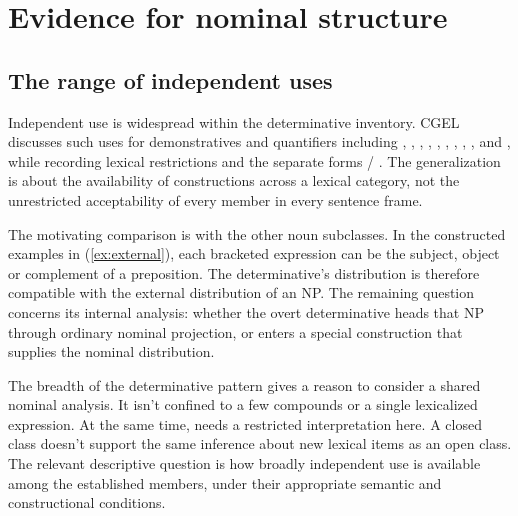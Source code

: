 \documentclass[12pt]{article}
\begin{document}
\section{Evidence for nominal structure}\label{sec:evidence}

\subsection{The range of independent uses}

Independent use is widespread within the determinative inventory. CGEL discusses such uses for demonstratives and quantifiers including , , , , , , , , ,  and , while recording lexical restrictions and the separate forms / \citep[371--372, 410--424]{huddleston2002}. The generalization is about the availability of constructions across a lexical category, not the unrestricted acceptability of every member in every sentence frame.

The motivating comparison is with the other noun subclasses. In the constructed examples in (\ref{ex:external}), each bracketed expression can be the subject, object or complement of a preposition. The determinative's distribution is therefore compatible with the external distribution of an NP. The remaining question concerns its internal analysis: whether the overt determinative heads that NP through ordinary nominal projection, or enters a special construction that supplies the nominal distribution.

\ea\label{ex:external}
\ea {}\qquad {}\qquad {}
\ex {}\qquad {}\qquad {}
\ex {}\qquad {}\qquad {}
\ex {}\qquad {}\qquad {}
\z\z

The breadth of the determinative pattern gives a reason to consider a shared nominal analysis. It isn't confined to a few compounds or a single lexicalized expression. At the same time,  needs a restricted interpretation here. A closed class doesn't support the same inference about new lexical items as an open class. The relevant descriptive question is how broadly independent use is available among the established members, under their appropriate semantic and constructional conditions.
\end{document}
